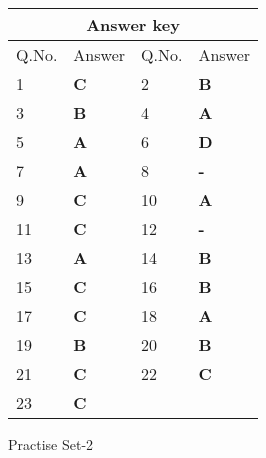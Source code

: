 \setlength\arrayrulewidth{1pt}
\begin{table}[H]
	\centering
	\begin{tabular}{|p{1.5cm}|p{1.5cm}||p{1.5cm}|p{1.5cm}|}
		\hline
		\multicolumn{4}{|c|}{\textbf{Answer key}}\\\hline\hline
		\rowcolor{ocrel}Q.No.&Answer&Q.No.&Answer\\\hline
		1&\textbf{C} &2&\textbf{B}\\\hline 
		3&\textbf{B} &4&\textbf{A} \\\hline
		5&\textbf{A} &6&\textbf{D} \\\hline
		7&\textbf{A}&8&\textbf{-}\\\hline
		9&\textbf{C}&10&\textbf{A}\\\hline
		11&\textbf{C} &12&\textbf{-}\\\hline
		13&\textbf{A}&14&\textbf{B}\\\hline
		15&\textbf{C}&16&\textbf{B}\\\hline
		17&\textbf{C} &18&\textbf{A}\\\hline
		19&\textbf{B}&20&\textbf{B}\\\hline
		21&\textbf{C}&22&\textbf{C}\\\hline
		23&\textbf{C}& &\\\hline
		
	\end{tabular}
\end{table}
\newpage
\begin{abox}
	Practise Set-2
\end{abox}
